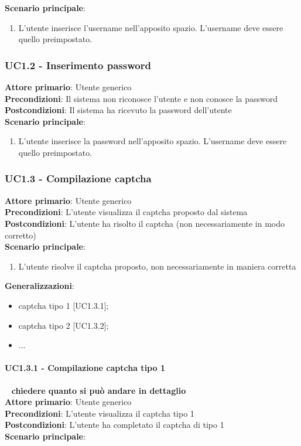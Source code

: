 \textbf{Scenario principale}:
\begin{enumerate}
   \item L'utente inserisce l'username nell'apposito spazio. L'username deve essere quello preimpostato.
\end{enumerate}

\subsubsection{UC1.2 - Inserimento password}
\textbf{Attore primario}: Utente generico\\
\textbf{Precondizioni}: Il sistema non riconosce l'utente e non conosce la password\\
\textbf{Postcondizioni}: Il sistema ha ricevuto la password dell'utente\\

\textbf{Scenario principale}:
\begin{enumerate}
   \item L'utente inserisce la password nell'apposito spazio. L'username deve essere quello preimpostato.
\end{enumerate}

\subsubsection{UC1.3 - Compilazione captcha}
\textbf{Attore primario}: Utente generico\\
\textbf{Precondizioni}: L'utente visualizza il captcha proposto dal sistema\\
\textbf{Postcondizioni}: L'utente ha risolto il captcha (non necessariamente in modo corretto)\\

\textbf{Scenario principale}:
\begin{enumerate}
   \item L'utente risolve il captcha proposto, non necessariamente in maniera corretta
\end{enumerate}
\textbf{Generalizzazioni}:
\begin{itemize}
   \item captcha tipo 1 [UC1.3.1];
   \item captcha tipo 2 [UC1.3.2];
   \item ...
\end{itemize}

\paragraph{UC1.3.1 - Compilazione captcha tipo 1 }~\smallskip
\textbf{chiedere quanto si può andare in dettaglio}\\
\textbf{Attore primario}: Utente generico\\
\textbf{Precondizioni}: L'utente visualizza il captcha tipo 1\\
\textbf{Postcondizioni}: L'utente ha completato il captcha di tipo 1\\
\textbf{Scenario principale}:

